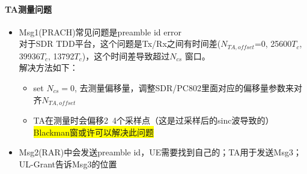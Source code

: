 \documentclass{article}
\begin{document}
\paragraph{TA测量问题}\mbox{}
\begin{itemize}
\item Msg1(PRACH)常见问题是preamble id error\\
对于SDR TDD平台，这个问题是Tx/Rx之间有时间差($N_{TA, offset}$=0, 25600$T_c$, 39936$T_c$, 13792$T_c$)，这个时间差导致超过$N_{cs}$ 窗口。\\
解决方法如下：
\begin{itemize}
\item set $N_{cs}=0$, 去测量偏移量，调整SDR/PC802里面对应的偏移量参数来对齐$N_{TA, offset}$
\item TA在测量时会偏移2~4个采样点（这是过采样后的sinc波导致的）{\colorbox{yellow}{Blackman窗或许可以解决此问题}}
\end{itemize}

\item Msg2(RAR)中会发送preamble id，UE需要找到自己的；TA用于发送Msg3；UL-Grant告诉Msg3的位置

\end{itemize}





\newpage


\end{document}
